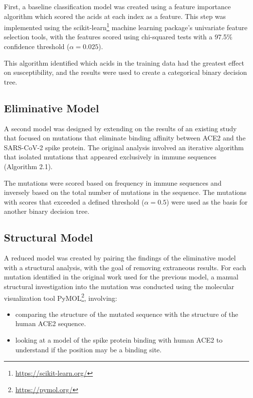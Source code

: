 First, a baseline classification model was created using a feature importance algorithm which scored the acids at each index as a feature. This step was implemented using the scikit-learn\footnote{\url{https://scikit-learn.org/}} machine learning package's univariate feature selection tools, with the features scored using chi-squared tests with a 97.5\% confidence threshold ($\alpha = 0.025$). 

This algorithm identified which acids in the training data had the greatest effect on susceptibility, and the results were used to create a categorical binary decision tree.

\subsection{Eliminative Model}

A second model was designed by extending on the results of an existing study  that focused on mutations that eliminate binding affinity between ACE2 and the SARS-CoV-2 spike protein. The original analysis involved an iterative algorithm that isolated mutations that appeared exclusively in immune sequences (Algorithm 2.1).



The mutations were scored based on frequency in immune sequences and inversely based on the total number of mutations in the sequence. The mutations with scores that exceeded a defined threshold ($\alpha = 0.5$) were used as the basis for another binary decision tree.

\subsection{Structural Model}

A reduced model was created by pairing the findings of the eliminative model with a structural analysis, with the goal of removing extraneous results. For each mutation identified in the original work used for the previous model, a manual structural investigation into the mutation was conducted using the molecular visualization tool PyMOL\footnote{\url{https://pymol.org/}}, involving:

\begin{itemize}
    \setlength\itemsep{0em}
    \item comparing the structure of the mutated sequence with the structure of the human ACE2 sequence.
    \item looking at a model of the spike protein binding with human ACE2 to understand if the position may be a binding site.
\end{itemize}

